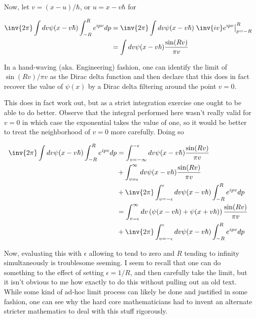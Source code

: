 Now, let $v = (x-u)/\hbar$, or $u=x-v\hbar$ for

\begin{align*}
\inv{{2\pi}} \int dv \psi(x -v\hbar) \int_{-R}^R e^{i p v} dp 
&= \inv{{2\pi}} \int dv \psi(x - v\hbar) \left. \inv{i v} e^{i p v} \right\vert_{p=-R}^R \\
&= \int dv \psi(x - v\hbar) \frac{\sin(R v)}{\pi v} \\
\end{align*}

In a hand-waving (aka. Engineering) fashion, one can identify the limit of $\sin(Rv)/\pi v$ as the Dirac delta function and
then declare that this does in fact recover the value of $\psi(x)$ by a Dirac delta filtering around the point $v=0$.

This does in fact work out, but as a strict integration exercise one ought to be able to do better.
Observe that the integral performed here wasn't really valid for $v=0$ in which case the exponential takes the value of one, so it would be
better to treat the neighborhood of $v=0$ more carefully.  Doing so

\begin{align*}
\inv{{2\pi}} \int dv \psi(x -v\hbar) \int_{-R}^R e^{i p v} dp 
&= \int_{v=-\infty}^{-\epsilon} dv \psi(x - v\hbar) \frac{\sin(R v)}{\pi v} \\
&+ \int_{v=\epsilon}^\infty dv \psi(x - v\hbar) \frac{\sin(R v)}{\pi v} \\
&+ \inv{{2\pi}} \int_{v=-\epsilon}^\epsilon dv \psi(x - v\hbar) \int_{-R}^R e^{i p v} dp \\
&= \int_{v=\epsilon}^\infty dv \left( \psi(x - v\hbar) +\psi(x + v\hbar) \right) \frac{\sin(R v)}{\pi v} \\
&+ \inv{{2\pi}} \int_{v=-\epsilon}^\epsilon dv \psi(x - v\hbar) \int_{-R}^R e^{i p v} dp \\
\end{align*}

Now, evaluating this with $\epsilon$ allowing to tend to zero and $R$ tending to infinity simultaneously is troublesome seeming.  I seem to recall that one
can do something to the effect of setting $\epsilon=1/R$, and then carefully take the limit, but it isn't obvious to me how exactly to do this without
pulling out an old text.
While some kind of ad-hoc limit process can likely be done and justified in some fashion, one can see why the hard core mathematicians had to invent
an alternate stricter mathematics to deal with this stuff rigorously.

